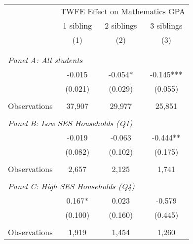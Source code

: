 \makeatletter
{}
{
\makeatother
\begin{tabular}{lccc}
\toprule
\cmidrule(lr){2-4}
& \multicolumn{3}{c}{TWFE Effect on Mathematics GPA} \\
\cmidrule(lr){2-4}
& 1 sibling & 2 siblings & 3 siblings  \\
\cmidrule(lr){2-2} \cmidrule(lr){3-3} \cmidrule(lr){4-4}
& (1) & (2) & (3)\\
\bottomrule
&  &  &  \\
&  &  &   \\
\multicolumn{4}{l}{\textit{Panel A: All students}} \\
\hspace{3mm}        &      -0.015   &      -0.054*  &      -0.145***\\
                    &     (0.021)   &     (0.029)   &     (0.055)   \\
                    &               &               &               \\
\hspace{3mm}Observations&      37,907   &      29,977   &      25,851   \\
 
&  &  &   \\
\multicolumn{4}{l}{\textit{Panel B: Low SES Households (Q1)}} \\
\hspace{3mm}        &      -0.019   &      -0.063   &      -0.444** \\
                    &     (0.082)   &     (0.102)   &     (0.175)   \\
                    &               &               &               \\
\hspace{3mm}Observations&       2,657   &       2,125   &       1,741   \\
 
&  &  &   \\
\multicolumn{4}{l}{\textit{Panel C: High SES Households (Q4)}} \\
\hspace{3mm}        &       0.167*  &       0.023   &      -0.579   \\
                    &     (0.100)   &     (0.160)   &     (0.445)   \\
                    &               &               &               \\
\hspace{3mm}Observations&       1,919   &       1,454   &       1,260   \\
 

\end{tabular}}
